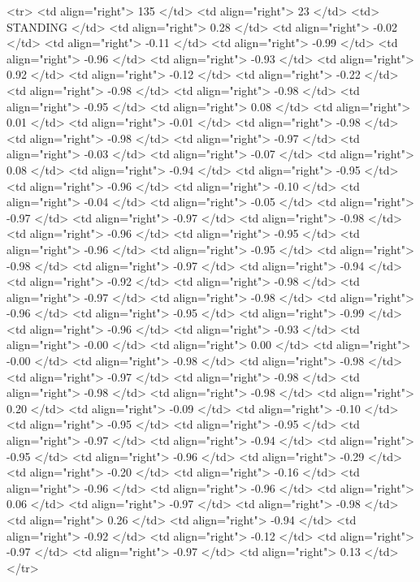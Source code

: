   <tr> <td align="right"> 135 </td> <td align="right">  23 </td> <td> STANDING </td> <td align="right"> 0.28 </td> <td align="right"> -0.02 </td> <td align="right"> -0.11 </td> <td align="right"> -0.99 </td> <td align="right"> -0.96 </td> <td align="right"> -0.93 </td> <td align="right"> 0.92 </td> <td align="right"> -0.12 </td> <td align="right"> -0.22 </td> <td align="right"> -0.98 </td> <td align="right"> -0.98 </td> <td align="right"> -0.95 </td> <td align="right"> 0.08 </td> <td align="right"> 0.01 </td> <td align="right"> -0.01 </td> <td align="right"> -0.98 </td> <td align="right"> -0.98 </td> <td align="right"> -0.97 </td> <td align="right"> -0.03 </td> <td align="right"> -0.07 </td> <td align="right"> 0.08 </td> <td align="right"> -0.94 </td> <td align="right"> -0.95 </td> <td align="right"> -0.96 </td> <td align="right"> -0.10 </td> <td align="right"> -0.04 </td> <td align="right"> -0.05 </td> <td align="right"> -0.97 </td> <td align="right"> -0.97 </td> <td align="right"> -0.98 </td> <td align="right"> -0.96 </td> <td align="right"> -0.95 </td> <td align="right"> -0.96 </td> <td align="right"> -0.95 </td> <td align="right"> -0.98 </td> <td align="right"> -0.97 </td> <td align="right"> -0.94 </td> <td align="right"> -0.92 </td> <td align="right"> -0.98 </td> <td align="right"> -0.97 </td> <td align="right"> -0.98 </td> <td align="right"> -0.96 </td> <td align="right"> -0.95 </td> <td align="right"> -0.99 </td> <td align="right"> -0.96 </td> <td align="right"> -0.93 </td> <td align="right"> -0.00 </td> <td align="right"> 0.00 </td> <td align="right"> -0.00 </td> <td align="right"> -0.98 </td> <td align="right"> -0.98 </td> <td align="right"> -0.97 </td> <td align="right"> -0.98 </td> <td align="right"> -0.98 </td> <td align="right"> -0.98 </td> <td align="right"> 0.20 </td> <td align="right"> -0.09 </td> <td align="right"> -0.10 </td> <td align="right"> -0.95 </td> <td align="right"> -0.95 </td> <td align="right"> -0.97 </td> <td align="right"> -0.94 </td> <td align="right"> -0.95 </td> <td align="right"> -0.96 </td> <td align="right"> -0.29 </td> <td align="right"> -0.20 </td> <td align="right"> -0.16 </td> <td align="right"> -0.96 </td> <td align="right"> -0.96 </td> <td align="right"> 0.06 </td> <td align="right"> -0.97 </td> <td align="right"> -0.98 </td> <td align="right"> 0.26 </td> <td align="right"> -0.94 </td> <td align="right"> -0.92 </td> <td align="right"> -0.12 </td> <td align="right"> -0.97 </td> <td align="right"> -0.97 </td> <td align="right"> 0.13 </td> </tr>
